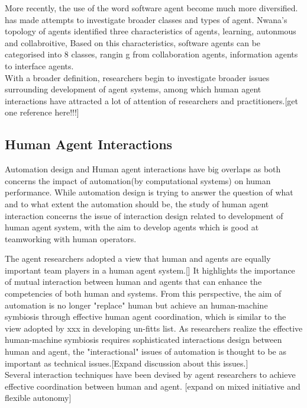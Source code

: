 More recently, the use of the word software agent become much more diversified. \cite{Nwana1996} has made attempts to investigate broader classes and types of agent. Nwana's \cite{Nwana1996} topology of agents identified three characteristics of agents, learning, autonmous and collabroitive, Based on this characteristics, software agents can be categorised into 8 classes, rangin g from collaboration agents, information agents to interface agents. \\

With a broader definition, researchers begin to investigate broader issues surrounding development of agent systems, among which human agent interactions have attracted a lot of attention of researchers and practitioners.[get one reference here!!!]

\subsection{Human Agent Interactions }

Automation design and Human agent interactions have big overlaps as both concerns the impact of automation(by computational systems) on human performance. While automation design is trying to answer the question of what and to what extent the automation should be, the study of human agent interaction concerns the issue of interaction design related to development of human agent system, with the aim to develop agents which is good at teamworking with human operators. 

The agent researchers adopted a view that human and agents are equally important team players in a human agent system.[] It highlights the importance of mutual interaction between human and agents that can enhance the competencies of both human and systems. From this perspective, the aim of automation is no longer "replace" human but achieve an human-machine symbiosis through effective human agent coordination, which is similar to the view adopted by xxx in developing un-fitts list. As researchers realize the effective human-machine symbiosis requires sophisticated interactions design between human and agent, the "interactional" issues of automation is thought to be as important as technical issues.[Expand discussion about this issues.] \cite{Bradshaw2011} \\

Several interaction techniques have been devised by agent researchers to achieve effective coordination between human and agent. [expand on mixed initiative and flexible autonomy]

